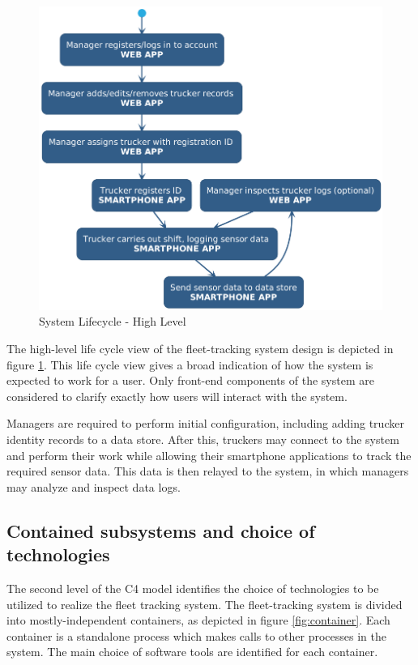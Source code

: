 \begin{figure}
\centering
\includegraphics[scale=0.40]{../diag/high_level_activity.png}
\caption{System Lifecycle - High Level}
\label{fig:high_level_activity}
\end{figure}

The high-level life cycle view of the fleet-tracking system design is depicted in figure \ref{fig:high_level_activity}.
This life cycle view gives a broad indication of how the system is expected to work for a user.
Only front-end components of the system are considered to clarify exactly how users will interact with the system.

Managers are required to perform initial configuration, including adding trucker identity records to a data store.
After this, truckers may connect to the system and perform their work while allowing their smartphone applications to track the required sensor data. 
This data is then relayed to the system, in which managers may analyze and inspect data logs.

\subsection{Contained subsystems and choice of technologies}
The second level of the C4 model identifies the choice of technologies to be utilized to realize the fleet tracking system.
The fleet-tracking system is divided into mostly-independent containers, as depicted in figure \ref{fig:container}.
Each container is a standalone process which makes calls to other processes in the system.
The main choice of software tools are identified for each container.

